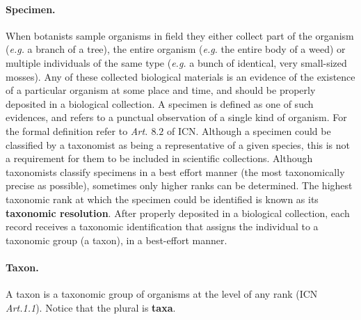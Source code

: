 \paragraph*{Specimen.}
When botanists sample organisms in field they either collect part of the organism (\textit{e.g.} a branch of a tree), the entire organism (\textit{e.g.} the entire body of a weed) or multiple individuals of the same type (\textit{e.g.} a bunch of identical, very small-sized mosses). 
Any of these collected biological materials is an evidence of the existence of a particular organism at some place and time, and should be properly deposited in a biological collection. A specimen is defined as one of such evidences, and refers to a punctual observation of a single kind of organism. For the formal definition refer to \textit{Art. $8.2$} of ICN. 
Although a specimen could be classified by a taxonomist as being a representative of a given species, this is not a requirement for them to be included in scientific collections. Although taxonomists classify specimens in a best effort manner (the most taxonomically precise as possible), sometimes only higher ranks can be determined. The highest taxonomic rank at which the specimen could be identified is known as its \textbf{taxonomic resolution}.
After properly deposited in a biological collection, each record receives a taxonomic identification that assigns the individual to a taxonomic group (a taxon), in a best-effort manner.

\paragraph*{Taxon.}

A taxon is a taxonomic group of organisms at the level of any rank (ICN \textit{Art.1.1}). Notice that the plural is \textbf{taxa}.





